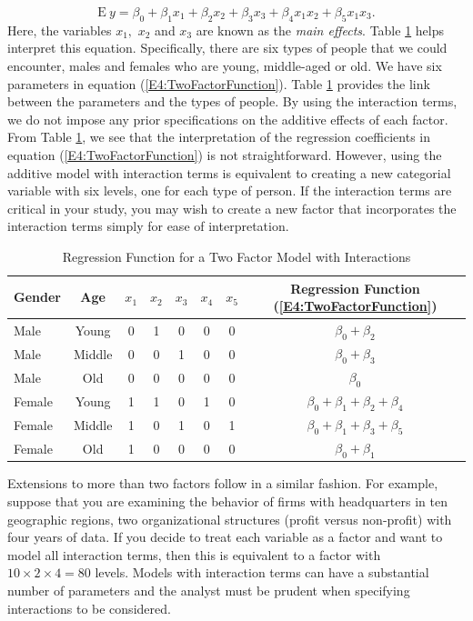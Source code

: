 \begin{equation}\label{E4:TwoFactorFunction}
\mathrm{E}~y = \beta_0 + \beta_1 x_1 + \beta_2 x_2+ \beta_3 x_3 +
\beta_4 x_1 x_2 + \beta_5 x_1 x_3 .
\end{equation}
Here, the variables $x_1,$ $x_2$ and $x_3$ are known as the\textit{
main effects}. Table \ref{T4:TwoFactorModel} helps interpret this
equation. Specifically, there are six types of people that we could
encounter, males and females who are young, middle-aged or old. We
have six parameters in equation (\ref{E4:TwoFactorFunction}). Table
\ref{T4:TwoFactorModel} provides the link between the parameters and
the types of people. By using the interaction terms, we do not
impose any prior specifications on the additive effects of each
factor. From Table \ref{T4:TwoFactorModel}, we see that the
interpretation of the regression coefficients in equation
(\ref{E4:TwoFactorFunction}) is not straightforward. However, using
the additive model with interaction terms is equivalent to creating
a new categorial variable with six levels, one for each type of
person. If the interaction terms are critical in your study, you may
wish to create a new factor that incorporates the interaction terms
simply for ease of interpretation.

\begin{table}[htp]
\caption{\label{T4:TwoFactorModel} Regression Function for a Two
Factor Model with Interactions}
\begin{tabular}{lc|ccccc|c}
\hline Gender & Age & $x_1$ & $x_2$ &  $x_3$ &  $x_4$ &  $x_5$ &
Regression Function (\ref{E4:TwoFactorFunction})
\\
\hline
Male & Young    & 0 & 1 & 0 & 0 & 0 & $\beta_0 +\beta_2$\\
Male & Middle   & 0 & 0 & 1 & 0 & 0 & $\beta_0 +\beta_3$\\
Male & Old      & 0 & 0 & 0 & 0 & 0 & $\beta_0 $\\
Female & Young  & 1 & 1 & 0 & 1 & 0 & $\beta_0 +\beta_1+\beta_2+\beta_4$\\
Female & Middle & 1 & 0 & 1 & 0 & 1 & $\beta_0 +\beta_1+\beta_3+\beta_5$\\
Female & Old    & 1 & 0 & 0 & 0 & 0 & $\beta_0 +\beta_1$\\
 \hline
\end{tabular}
 \end{table}

Extensions to more than two factors follow in a similar fashion. For
example, suppose that you are examining the behavior of firms with
headquarters in ten geographic regions, two organizational
structures (profit versus non-profit) with four years of data. If
you decide to treat each variable as a factor and want to model all
interaction terms, then this is equivalent to a factor with $10
\times 2 \times 4 =80$ levels. Models with interaction terms can
have a substantial number of parameters and the analyst must be
prudent when specifying interactions to be considered.



